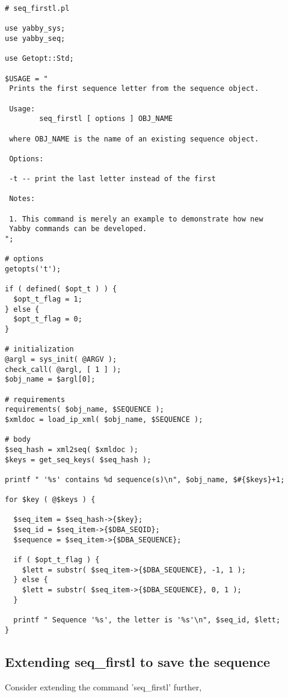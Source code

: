 \begin{verbatim}
# seq_firstl.pl

use yabby_sys;
use yabby_seq;

use Getopt::Std;

$USAGE = "
 Prints the first sequence letter from the sequence object. 

 Usage:
        seq_firstl [ options ] OBJ_NAME

 where OBJ_NAME is the name of an existing sequence object.

 Options:

 -t -- print the last letter instead of the first

 Notes:

 1. This command is merely an example to demonstrate how new
 Yabby commands can be developed.
";

# options
getopts('t');

if ( defined( $opt_t ) ) {
  $opt_t_flag = 1;
} else {
  $opt_t_flag = 0;
}

# initialization
@argl = sys_init( @ARGV );
check_call( @argl, [ 1 ] );
$obj_name = $argl[0];

# requirements
requirements( $obj_name, $SEQUENCE );
$xmldoc = load_ip_xml( $obj_name, $SEQUENCE );

# body
$seq_hash = xml2seq( $xmldoc );
$keys = get_seq_keys( $seq_hash );

printf " '%s' contains %d sequence(s)\n", $obj_name, $#{$keys}+1;

for $key ( @$keys ) {

  $seq_item = $seq_hash->{$key};
  $seq_id = $seq_item->{$DBA_SEQID};
  $sequence = $seq_item->{$DBA_SEQUENCE};

  if ( $opt_t_flag ) {
    $lett = substr( $seq_item->{$DBA_SEQUENCE}, -1, 1 );
  } else {
    $lett = substr( $seq_item->{$DBA_SEQUENCE}, 0, 1 );
  }

  printf " Sequence '%s', the letter is '%s'\n", $seq_id, $lett;
}
\end{verbatim}

\subsection{Extending seq\_firstl to save the sequence}

Consider extending the command 'seq\_firstl' further, 

